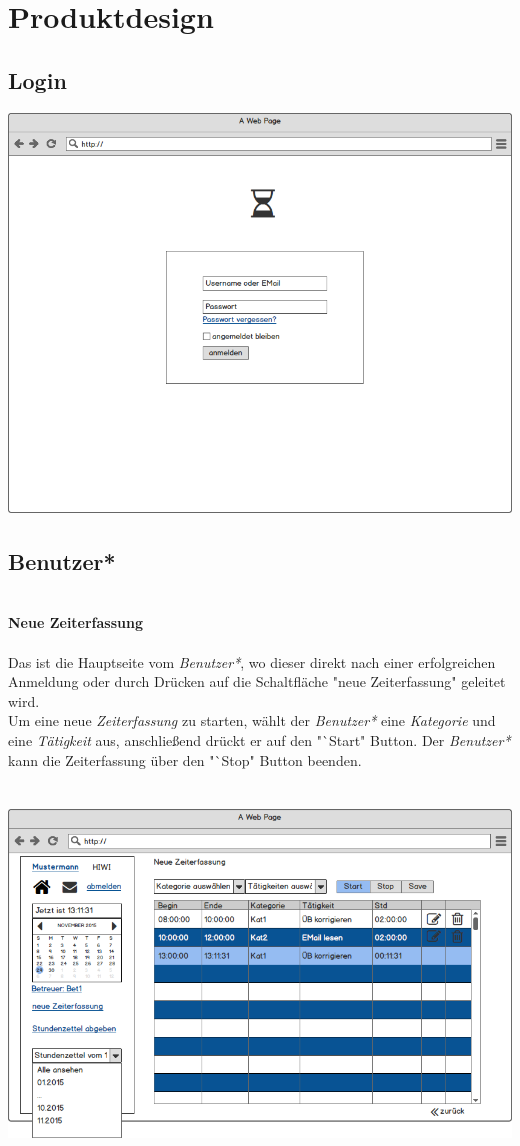 \section{Produktdesign}

\subsection{Login}
\includegraphics[width=\linewidth]{UI/Login/Login.png}

\newpage
\subsection{Benutzer*}

\textbf{\\Neue Zeiterfassung}\\
\\
Das ist die Hauptseite vom \emph{Benutzer*}, wo dieser direkt nach einer erfolgreichen Anmeldung oder durch Drücken auf die Schaltfläche "neue Zeiterfassung" geleitet wird. \\
Um eine neue \emph{Zeiterfassung} zu starten, wählt der \emph{Benutzer*} eine \emph{Kategorie} und eine \emph{Tätigkeit} aus, anschließend drückt er auf den "`Start"  Button. Der \emph{Benutzer*} kann die Zeiterfassung über den "`Stop"  Button beenden.\\
\\
\\
\includegraphics[width=\linewidth]{UI/Benutzer/Zeiterfassung.png}


